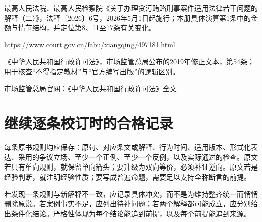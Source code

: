 \begin{description}[itemsep=4pt,parsep=0pt,topsep=4pt]
\item[\hypertarget{L8}{L8}] 最高人民法院、最高人民检察院《关于办理贪污贿赂刑事案件适用法律若干问题的解释（二）》，法释〔2026〕6号，2026年5月1日起施行；本册具体演算第1条中的金额与情节结构，并定位第8、11至17条有关变化。\par\url{https://www.court.gov.cn/fabu/xiangqing/497181.html}
\item[\hypertarget{L9}{L9}] 《中华人民共和国行政许可法》，市场监管总局公布的2019年修正文本，第54条；用于核查“不得指定教材”与“官方编写出版”的逻辑区别。\par\href{https://www.samr.gov.cn/zw/zfxxgk/fdzdgknr/tzsbs/art/2023/art_3f97055b34d241dbaba5d4a81757901f.html}{市场监管总局官网：《中华人民共和国行政许可法》全文}
\end{description}
\endgroup

\section{继续逐条校订时的合格记录}
每条原书规则均应保存：原句、对应条文或解释、行为时间、适用版本、形式化表达、采用的争议立场、至少一个正例、至少一个反例，以及实际通过的检查。原文若只有单向规则，就保留单向箭头；要升级为双向等价，必须补证逆向。原文若是经验判断，就注明经验性质；要写成普遍命题，需要足以支持全称断言的前提。

若发现一条规则与新解释不一致，应记录具体冲突，而不是为维持整齐统一而悄悄删除原说。若案例事实不足，应列出待补问题；若两个解释都可能成立，应分别给出条件化结论。严格性体现为每个结论能追到前提，以及每个前提能追到来源。
